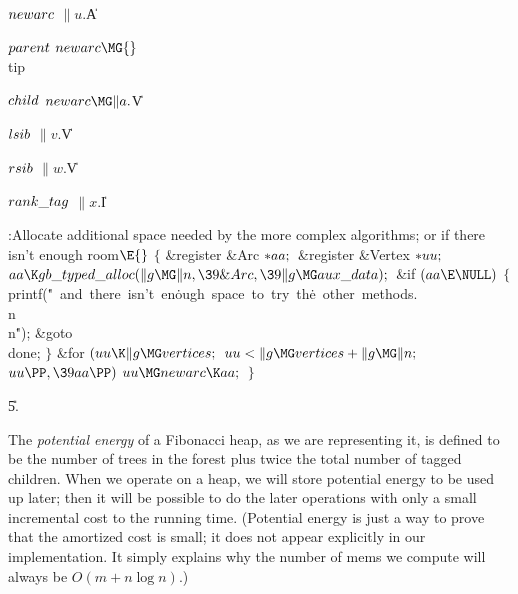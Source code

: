 \Y\B\4\D$\\{newarc}$ \5
$\|u.{}$\|A\par
\B\4\D$\\{parent}$ \5
$\\{newarc}\MG{}$\\{tip}\par
\B\4\D$\\{child}$ \5
$\\{newarc}\MG\|a.{}$\|V\par
\B\4\D$\\{lsib}$ \5
$\|v.{}$\|V\par
\B\4\D$\\{rsib}$ \5
$\|w.{}$\|V\par
\B\4\D$\\{rank\_tag}$ \5
$\|x.{}$\|I\par
\Y\B\4:Allocate additional space needed by the more complex algorithms; or %
 if there isn't enough room\X${}\E{}$\6
${}\{{}$\5
\1\&{register} \&{Arc} ${}{*}\\{aa};{}$\6
\&{register} \&{Vertex} ${}{*}\\{uu};{}$\7
${}\\{aa}\K\\{gb\_typed\_alloc}(\|g\MG\|n,\39\&{Arc},\39\|g\MG\\{aux%
\_data});{}$\6
\&{if} ${}(\\{aa}\E\NULL){}$\5
${}\{{}$\1\6
\\{printf}(\.{"\ and\ there\ isn't\ en}\)\.{ough\ space\ to\ try\ th}\)\.{e\
other\ methods.\\n\\n}\)\.{"});\6
\&{goto} \\{done};\6
\4${}\}{}$\2\6
\&{for} ${}(\\{uu}\K\|g\MG\\{vertices};{}$ ${}\\{uu}<\|g\MG\\{vertices}+\|g\MG%
\|n;{}$ ${}\\{uu}\PP,\39\\{aa}\PP){}$\1\5
${}\\{uu}\MG\\{newarc}\K\\{aa};{}$\2\6
\4${}\}{}$\2\par
\U5.\fi

The {\sl potential energy\/} of a Fibonacci heap, as we are
representing it, is defined to be the number of trees in the forest
plus twice the total number of tagged children. When we operate on a
heap, we will store potential energy to be used up later; then it will
be possible to do the later operations with only a small incremental
cost to the running time. (Potential energy is just a way to prove
that the amortized cost is small; it does not appear explicitly in our
implementation. It simply explains why the number of mems we compute
will always be $O(m+n\log n)$.)

